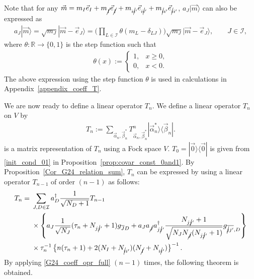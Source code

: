 \documentclass[10pt,a4paper]{amsart}
\numberwithin{equation}{section}
\begin{document}
Note that for any
$
\vec{m}
=
m_{I}
\vec{e}_{I}
+
m_{\cancel{I}}
\vec{e}_{\cancel{I}}
+
m_{i\cancel{i}'}
\vec{e}_{i\cancel{i}'}
+
m_{\cancel{i}i'}
\vec{e}_{\cancel{i}i'}
$,
$
a_{J}
|
\vec{m}
\rangle
$
can also be expressed as
\begin{align}
a_{J}
|
\vec{m}
\rangle
=
\sqrt{m_{J}}
|
\vec{m}
-
\vec{e}_{J}
\rangle
=
 \bigg(
\prod_{
L
\in
\mathcal{I}
}
\theta
(
m_{L}
-
\delta_{LJ}
)
 \bigg)
\sqrt{m_{J}}
|
\vec{m}
-
\vec{e}_{J}
\rangle
,\qquad
J\in\mathcal{I},\label{braket_ann_step_fct}
\end{align}
where
$
\theta
\colon
\mathbb{R}
\to
\{
0,1
\}
$
is the step function such that
\begin{align*}
\theta(x)
:=
\begin{cases}
1,
&
x\geq0,
\\
0,
&
x<0.
\end{cases}
\end{align*}
The above expression using the step function $\theta$ is used in calculations in Appendix~\ref{appendix_coeff_T}.

We are now ready to define a linear operator $T_{n}$. We define a linear operator $T_{n}$ on $V$ by
\begin{align}
T_{n}
:=
\sum_{\vec{\alpha}_{n},\vec{\beta}_{n}^{\ast}}
T^{n}_{\vec{\alpha}_{n},\vec{\beta}_{n}^{\ast}}
|
\vec{\alpha}_{n}^{\ast}
\rangle
\langle
\vec{\beta}_{n}|.\label{braket_coeff}
\end{align}
 is a matrix representation of $T_{n}$ using a Fock space $V$.
$
T_{0}
=
|
\vec{0}
\rangle
\langle
\vec{0}
|
$
is given from \eqref{init_cond_01} in Proposition~\ref{prop:covar_const_0and1}.
By Proposition~\ref{Cor_G24_relation_sum}, $T_{n}$ can be expressed by using a linear operator $T_{n-1}$ of order $(n-1)$ as follows:
\begin{align}
 T_{n}
 ={}&
 \sum_{
 J,D
 \in
 \mathcal{I}
 }
 a_{D}^{\dagger}
 \frac{1}{
 \sqrt{
 N_{D}
 +
 1
 }
 }
 T_{n-1}\nonumber\\
 &\times
 \left\{
 a_{J}
 \frac{1}{\sqrt{N_{J}}}
 (
 \tau_{n}
 +
 N_{j\cancel{j}'}
 +
 1
 )
 g_{\overline{J}D}
 +
 a_{J}
 a_{\cancel{J}}
 a_{j\cancel{j}'}^{\dagger}
 \frac{N_{j\cancel{j}'}+1}{
 \sqrt{
 N_{J}
 N_{\cancel{J}}
 (
 N_{j\cancel{j}'}+1
 )
 }
 }
 g_{\overline{\cancel{j}j'},D}
 \right\}
 \nonumber
 \\
 &
 \times
 \tau_{n}^{-1}
 \left\{
 n
 (
 \tau_{n}
 +
 1
 )
 +
 2
 (
 N_{I}
 +
 N_{\cancel{i}i'}
 )
 (
 N_{\cancel{I}}
 +
 N_{i\cancel{i}'}
 )
 \right\}^{-1}. \label{G24_coeff_opr_full}
\end{align}
By applying \eqref{G24_coeff_opr_full} $(n-1)$ times,
the following theorem is obtained.
\end{document}
